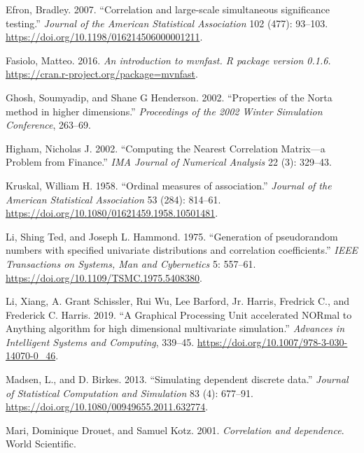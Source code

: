 \documentclass{article}
\newlength{\cslhangindent}
\newenvironment{CSLReferences}[2] %
 {%
  \setlength{\parindent}{0pt}
  \ifodd #1 \everypar{\setlength{\hangindent}{\cslhangindent}}\ignorespaces\fi
  \ifnum #2 > 0
  \setlength{\parskip}{#2\baselineskip}
  \fi
 }%
 {}
\begin{document}
\begin{CSLReferences}{1}{0}
\leavevmode{}%
Efron, Bradley. 2007. {``{Correlation and large-scale simultaneous
significance testing}.''} \emph{Journal of the American Statistical
Association} 102 (477): 93--103.
\url{https://doi.org/10.1198/016214506000001211}.

\leavevmode{}%
Fasiolo, Matteo. 2016. \emph{{An introduction to mvnfast. R package
version 0.1.6.}} \url{https://cran.r-project.org/package=mvnfast}.

\leavevmode{}%
Ghosh, Soumyadip, and Shane G Henderson. 2002. {``{Properties of the
Norta method in higher dimensions}.''} \emph{Proceedings of the 2002
Winter Simulation Conference}, 263--69.

\leavevmode{}%
Higham, Nicholas J. 2002. {``Computing the Nearest Correlation
Matrix---a Problem from Finance.''} \emph{IMA Journal of Numerical
Analysis} 22 (3): 329--43.

\leavevmode{}%
Kruskal, William H. 1958. {``{Ordinal measures of association}.''}
\emph{Journal of the American Statistical Association} 53 (284):
814--61. \url{https://doi.org/10.1080/01621459.1958.10501481}.

\leavevmode{}%
Li, Shing Ted, and Joseph L. Hammond. 1975. {``{Generation of
pseudorandom numbers with specified univariate distributions and
correlation coefficients}.''} \emph{IEEE Transactions on Systems, Man
and Cybernetics} 5: 557--61.
\url{https://doi.org/10.1109/TSMC.1975.5408380}.

\leavevmode{}%
Li, Xiang, A. Grant Schissler, Rui Wu, Lee Barford, Jr. Harris, Fredrick
C., and Frederick C. Harris. 2019. {``{A Graphical Processing Unit
accelerated NORmal to Anything algorithm for high dimensional
multivariate simulation}.''} \emph{Advances in Intelligent Systems and
Computing}, 339--45. \url{https://doi.org/10.1007/978-3-030-14070-0_46}.

\leavevmode{}%
Madsen, L., and D. Birkes. 2013. {``{Simulating dependent discrete
data}.''} \emph{Journal of Statistical Computation and Simulation} 83
(4): 677--91. \url{https://doi.org/10.1080/00949655.2011.632774}.

\leavevmode{}%
Mari, Dominique Drouet, and Samuel Kotz. 2001. \emph{{Correlation and
dependence}}. World Scientific.


\end{CSLReferences}
\end{document}
